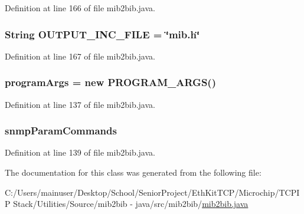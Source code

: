 Definition at line 166 of file mib2bib.\+java.

\hypertarget{classmib2bib_1_1mib2bib_a9ddaabd0ae87bd3583e9a29d22bc6be5}{}
\subsubsection[{O\+U\+T\+P\+U\+T\+\_\+\+I\+N\+C\+\_\+\+F\+I\+L\+E}]{\setlength{\rightskip}{0pt plus 5cm}String O\+U\+T\+P\+U\+T\+\_\+\+I\+N\+C\+\_\+\+F\+I\+L\+E = \char`\"{}mib.\+h\char`\"{}\hspace{0.3cm}{\ttfamily [static]}}\label{classmib2bib_1_1mib2bib_a9ddaabd0ae87bd3583e9a29d22bc6be5}


Definition at line 167 of file mib2bib.\+java.

\hypertarget{classmib2bib_1_1mib2bib_a7368cf1f2e677cdf37b1daf2f907f520}{}
\subsubsection[{program\+Args}]{ program\+Args = new {\bf P\+R\+O\+G\+R\+A\+M\+\_\+\+A\+R\+G\+S}()}\label{classmib2bib_1_1mib2bib_a7368cf1f2e677cdf37b1daf2f907f520}


Definition at line 137 of file mib2bib.\+java.

\hypertarget{classmib2bib_1_1mib2bib_abc4c23127ec665cd09c0e0103895e42a}{}
\subsubsection[{snmp\+Param\+Commands}]{ snmp\+Param\+Commands}\label{classmib2bib_1_1mib2bib_abc4c23127ec665cd09c0e0103895e42a}


Definition at line 139 of file mib2bib.\+java.



The documentation for this class was generated from the following file\+:\begin{DoxyCompactItemize}
\item 
C\+:/\+Users/mainuser/\+Desktop/\+School/\+Senior\+Project/\+Eth\+Kit\+T\+C\+P/\+Microchip/\+T\+C\+P\+I\+P Stack/\+Utilities/\+Source/mib2bib -\/ java/src/mib2bib/\hyperlink{mib2bib_8java}{mib2bib.\+java}\end{DoxyCompactItemize}
